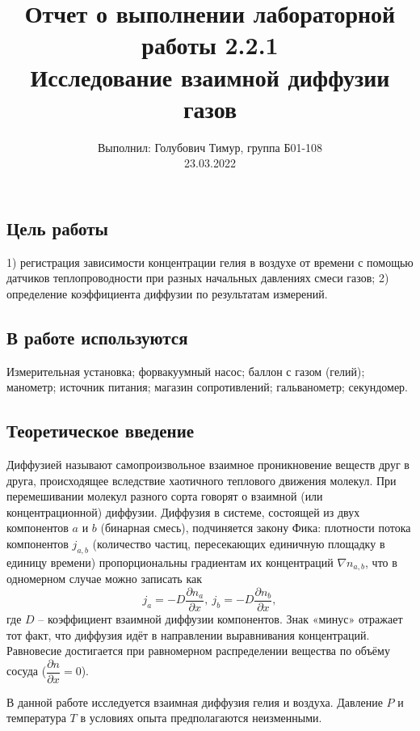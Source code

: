 \documentclass[12pt,a4paper]{article}
\author{\normalsize Выполнил: Голубович Тимур, группа Б01-108 \\
	\normalsize 23.03.2022}
\date{}
\title
{
	\large Отчет о выполнении лабораторной работы 2.2.1 \\
	\Large Исследование взаимной диффузии газов \\ 
}
\begin{document}
	\maketitle
	
	\subsection*{Цель работы} 1) регистрация зависимости концентрации гелия в воздухе от времени с помощью датчиков теплопроводности при разных начальных давлениях смеси газов; 2) определение коэффициента диффузии по результатам измерений.
	
	\subsection*{В работе используются}
	Измерительная установка; форвакуумный насос; баллон с газом (гелий); манометр; источник питания;
	магазин сопротивлений; гальванометр; секундомер.
	
	\subsection*{Теоретическое введение}
Диффузией называют самопроизвольное взаимное проникновение веществ друг в друга, происходящее вследствие хаотичного теплового движения молекул. При перемешивании молекул разного сорта говорят о взаимной (или концентрационной) диффузии. Диффузия в системе, состоящей из двух компонентов $a$ и $b$ (бинарная смесь), подчиняется закону Фика: плотности потока компонентов $j_{a, b}$ (количество частиц, пересекающих единичную площадку в единицу времени) пропорциональны градиентам их концентраций $\nabla n_{a, b}$, что в одномерном случае можно записать как 
\begin{equation}
	j_a = -D \dfrac{\partial n_a}{\partial x},~j_b = -D \dfrac{\partial n_b}{\partial x},
\end{equation}
где $D$ -- коэффициент взаимной диффузии компонентов. Знак «минус» отражает тот факт, что диффузия идёт в направлении выравнивания концентраций. Равновесие достигается при равномерном распределении вещества по объёму сосуда ($\dfrac{\partial n}{\partial x} = 0$).

В данной работе исследуется взаимная диффузия гелия и воздуха. Давление $P$ и температура $T$ в условиях опыта предполагаются неизменными.
\end{document}

